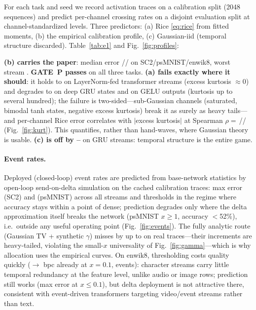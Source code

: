 \documentclass[10pt]{article}
\begin{document}
For each task and seed we record activation traces on a calibration split
(2048 sequences) and predict per-channel crossing rates on a disjoint
evaluation split at channel-standardized levels. Three predictors: (a)
Rice \eqref{eq:rice} from fitted moments, (b) the empirical calibration
profile, (c) Gaussian-iid (temporal structure discarded).
Table~\ref{tab:e1} and Fig.~\ref{fig:profiles}:

\textbf{(b) carries the paper}: median error
\EmpMedianSCTwo{}/\EmpMedianPsMNIST{}/\EmpMedianEnwik{} on
SC2/psMNIST/enwik8, worst stream \EmpMaxEnwik. \textbf{GATE~P passes} on
all three tasks. \textbf{(a) fails exactly where it should}: it holds to
\RiceMinEnwik{} on LayerNorm-fed transformer streams (excess kurtosis
$\approx$0) and degrades to \RiceMaxSCTwo{} on deep GRU states and
\RiceMaxEnwik{} on GELU outputs (kurtosis up to several hundred);
the failure is two-sided---sub-Gaussian channels (saturated, bimodal tanh
states, negative excess kurtosis) break it as surely as heavy tails---and
per-channel Rice error correlates with $|$excess kurtosis$|$ at Spearman
$\rho=$\,\KurtSpearmanSCTwo{}/\KurtSpearmanPsMNIST{}/\KurtSpearmanEnwik{}
(Fig.~\ref{fig:kurt}). This quantifies, rather than hand-waves, where
Gaussian theory is usable.
\textbf{(c) is off by \IidMinSCTwo--\IidMaxSCTwo{}} on GRU streams:
temporal structure is the entire game.

\paragraph{Event rates.}
Deployed (closed-loop) event rates are predicted from base-network
statistics by open-loop send-on-delta simulation on the cached calibration
traces: max error \EventOpenloopMaxSCTwo{} (SC2) and
\EventOpenloopMaxPsMNIST{} (psMNIST) across all streams and thresholds in
the regime where accuracy stays within a point of dense; prediction
degrades only where the delta approximation itself breaks the network
(psMNIST $x\ge1$, accuracy $<$52\%), i.e.\ outside any useful operating
point (Fig.~\ref{fig:events}). The fully analytic route (Gaussian TV +
synthetic $\gamma$) misses by up to \AnalyticGammaWorstSCTwo{} on real
traces---their increments are heavy-tailed, violating the small-$x$
universality of Fig.~\ref{fig:gamma}---which is why allocation uses the
empirical curves. On enwik8, thresholding costs quality quickly
(\BaseBpcEnwik$\to$\BpcAtXPointOne{} bpc already at $x{=}0.1$,
\EventsAtXPointOneEnwik{} events): character streams carry little temporal
redundancy at the feature level, unlike audio or image rows; prediction
still works (max \EventOpenloopMaxEnwikDeploy{} error at $x\le0.1$), but
delta deployment is not attractive there, consistent with event-driven
transformers targeting video/event streams rather than text.
\end{document}
